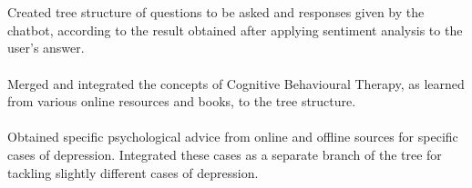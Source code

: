 \documentclass{report}
\begin{document}
     \setlength{\baselineskip}{+8mm}
     
     \\[-9mm]
     
     \paragraph{}{\fontsize{15}{18}\selectfont Created tree structure of questions to be asked and responses given by the chatbot, according to the result obtained after applying sentiment analysis to the user's answer.}\\[-8mm]
     
     \paragraph{}{\fontsize{15}{18}\selectfont Merged and integrated the concepts of Cognitive Behavioural Therapy,  as learned from various online resources and books, to the tree structure.}\\[-8mm]
     
     \paragraph{}{\fontsize{15}{18}\selectfont Obtained specific psychological advice from online and offline sources for specific cases of depression. Integrated these cases as a separate branch of the tree for tackling slightly different cases of depression.}
     
     \newpage
     
\end{document}
